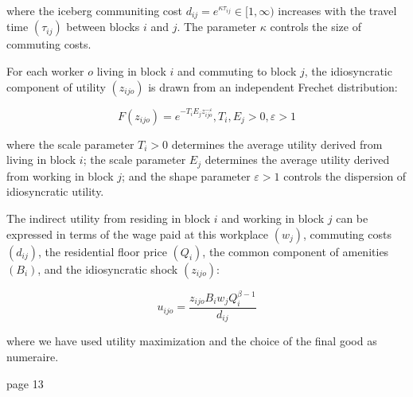 where the iceberg communiting cost $d_{ij} = e^{\kappa \tau_{ij}} \in [1, \infty)$ increases with the travel time $(\tau_{ij})$ between blocks $i$ and $j$. The parameter $\kappa$ controls the size of commuting costs.

For each worker $o$ living in block $i$ and commuting to block $j$, the idiosyncratic component of utility $(z_{ijo})$ is drawn from an independent Frechet distribution:

\begin{equation}
    F(z_{ijo}) = e^{-T_i E_j z_{ijo}^{-\varepsilon}}, T_i, E_j > 0, \varepsilon > 1
\end{equation}

where the scale parameter $T_i > 0$ determines the average utility derived from living in block $i$; the scale parameter $E_j$ determines the average utility derived from working in block $j$; and the shape parameter $\varepsilon > 1$ controls the dispersion of idiosyncratic utility.

The indirect utility from residing in block $i$ and working in block $j$ can be expressed in terms of the wage paid at this workplace $(w_j)$, commuting costs $(d_{ij})$, the residential floor price $(Q_i)$, the common component of amenities $(B_i)$, and the idiosyncratic shock $(z_{ijo})$:

\begin{equation}
    u_{ijo} = \frac{z_{ijo} B_i w_j Q_i^{\beta - 1}}{d_{ij}}
\end{equation}

where we have used utility maximization and the choice of the final good as numeraire.

page 13
